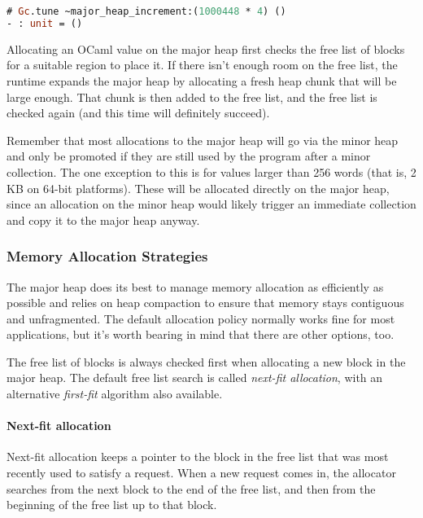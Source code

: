 \begin{lstlisting}[language=Caml]
# Gc.tune ~major_heap_increment:(1000448 * 4) ()
- : unit = ()
\end{lstlisting}

Allocating an OCaml value on the major heap first checks the free list
of blocks for a suitable region to place it. If there isn't enough room
on the free list, the runtime expands the major heap by allocating a
fresh heap chunk that will be large enough. That chunk is then added to
the free list, and the free list is checked again (and this time will
definitely succeed).

Remember that most allocations to the major heap will go via the minor
heap and only be promoted if they are still used by the program after a
minor collection. The one exception to this is for values larger than
256 words (that is, 2 KB on 64-bit platforms). These will be allocated
directly on the major heap, since an allocation on the minor heap would
likely trigger an immediate collection and copy it to the major heap
anyway.

\hypertarget{memory-allocation-strategies}{%
\subsubsection{Memory Allocation
Strategies}\label{memory-allocation-strategies}}

The major heap does its best to manage memory allocation as efficiently
as possible and relies on heap compaction to ensure that memory stays
contiguous and unfragmented. The default allocation policy normally
works fine for most applications, but it's worth bearing in mind that
there are other options, too.

The free list of blocks is always checked first when allocating a new
block in the major heap. The default free list search is called
\emph{next-fit allocation}, with an alternative \emph{first-fit}
algorithm also available.

\hypertarget{next-fit-allocation}{%
\paragraph{Next-fit allocation}\label{next-fit-allocation}}

Next-fit allocation keeps a pointer to the block in the free list that
was most recently used to satisfy a request. When a new request comes
in, the allocator searches from the next block to the end of the free
list, and then from the beginning of the free list up to that block.

